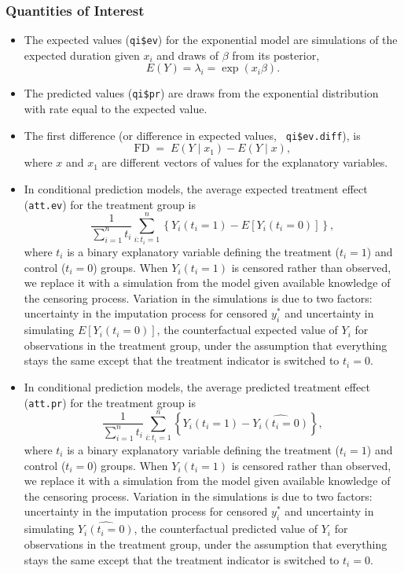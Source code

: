 \subsubsection{Quantities of Interest} 

\begin{itemize}
\item The expected values ({\tt qi\$ev}) for the exponential model are
  simulations of the expected duration given $x_i$ and draws of
  $\beta$ from its posterior, $$E(Y) = \lambda_i = \exp(x_i \beta).$$

\item The predicted values ({\tt qi\$pr}) are draws from the
  exponential distribution with rate equal to the expected value.  

\item The first difference (or difference in expected values, {\tt
  qi\$ev.diff}), is
\begin{equation}
\textrm{FD} \; = \; E(Y \mid x_1) - E(Y \mid x), 
\end{equation}
where $x$ and $x_1$ are different vectors of values for the
explanatory variables.  

\item In conditional prediction models, the average expected treatment
  effect ({\tt att.ev}) for the treatment group is \begin{equation*}
  \frac{1}{\sum_{i=1}^n t_i}\sum_{i:t_i=1}^n \left\{ Y_i(t_i=1) - E[Y_i(t_i=0)]
  \right\}, \end{equation*} where $t_i$ is a binary explanatory
  variable defining the treatment ($t_i=1$) and control ($t_i=0$)
  groups. When $Y_i(t_i=1)$ is censored rather than observed, we
  replace it with a simulation from the model given available
  knowledge of the censoring process.  Variation in the simulations
  is due to two factors: uncertainty in the imputation process for
  censored $y_i^*$ and uncertainty in simulating $E[Y_i(t_i=0)]$, the
  counterfactual expected value of $Y_i$ for observations in the
  treatment group, under the assumption that everything stays the same
  except that the treatment indicator is switched to $t_i=0$.
    
  \item In conditional prediction models, the average predicted
  treatment effect ({\tt att.pr}) for the treatment group is
  \begin{equation*} \frac{1}{\sum_{i=1}^n t_i}\sum_{i:t_i=1}^n \left\{ Y_i(t_i=1) -
  \widehat{Y_i(t_i=0)} \right\}, \end{equation*} where $t_i$ is a
  binary explanatory variable defining the treatment ($t_i=1$) and
  control ($t_i=0$) groups.  When $Y_i(t_i=1)$ is censored rather than
  observed, we replace it with a simulation from the model given
  available knowledge of the censoring process.  Variation in the
  simulations is due to two factors: uncertainty in the imputation
  process for censored $y_i^*$ and uncertainty in simulating
  $\widehat{Y_i(t_i=0)}$, the counterfactual predicted value of $Y_i$
  for observations in the treatment group, under the assumption that
  everything stays the same except that the treatment indicator is
  switched to $t_i=0$.


\end{itemize}

